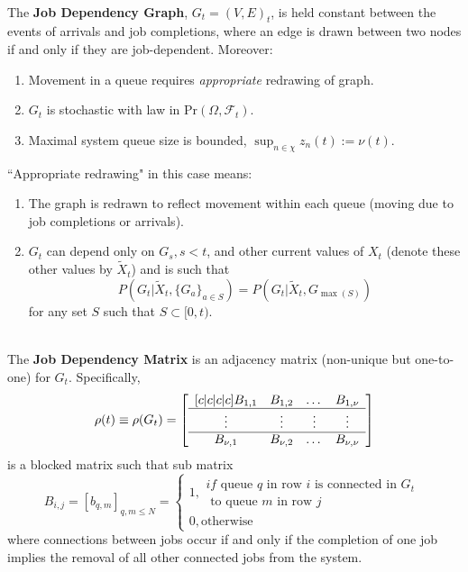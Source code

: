 \begin{definition}
    \hfill \\
    The \textbf{Job Dependency Graph}, $G_{t}=(V,E)_{t}$, is held constant between the events of arrivals and job completions, where an edge is drawn between two nodes if and only if they are job-dependent. Moreover:

    \begin{enumerate}
        \item Movement in a queue requires \textit{appropriate} redrawing of graph.
        \item $G_{t}$ is stochastic with law in $\text{Pr}(\Omega, \mathcal{F}_{t})$.
        \item Maximal system queue size is bounded, $\sup_{n \in \chi}z_{n}(t):=\nu(t).$
    \end{enumerate}
    ``Appropriate redrawing" in this case means:
    \begin{enumerate}
        \item The graph is redrawn to reflect movement within each queue (moving due to job completions or arrivals).
        \item $G_{t}$ can depend only on $G_{s}, s <t$, and other current values of $X_{t}$ (denote these other values by $\tilde X_{t}$) and is such that \[P(G_{t}|\tilde X_{t}, \{G_{a}\}_{a \in S})=P(G_{t}|\tilde X_{t}, G_{\max(S)})\]
        for any set $S$ such that $ S \subset [0,t)$.
    \end{enumerate}
    \label{dep1}
\end{definition}
\begin{definition}
    \hfill \\
    The \textbf{Job Dependency Matrix} is an adjacency matrix (non-unique but one-to-one) for $G_{t}$. Specifically,
    \begin{align}
        \rho(t)\equiv \rho(G_{t})=
        \left[  \enskip
        \begin{matrix}[c|c|c|c]
            B_{1,1}  & B_{1,2}  & \dots & B_{1,\nu}\\
            \hline
            \vdots & \vdots & \vdots &\vdots  \\
            \hline
            B_{\nu,1}  & B_{\nu,2} & \dots   & B_{\nu,\nu}\\
        \end{matrix} \enskip \right]
        \label{rho}
    \end{align}
    is a blocked matrix such that sub matrix
    \[B_{i,j}= [b_{q,m}]_{q,m \leq N} = \begin{cases}
                                            1, \substack{if \text{ queue } q \text{ in row } i \text{ is connected in } G_{t} \\ \text{ to queue } m \text{ in row } j}\\
                                            0, \text{otherwise}
    \end{cases}\]
    where connections between jobs occur if and only if the completion of one job implies the removal of all other connected jobs from the system.
    \label{jdf}
\end{definition}

